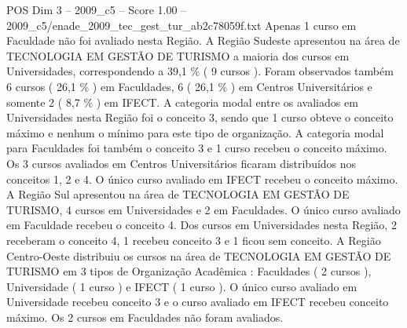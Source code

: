 \begin{textsample}{POS Dim 3 – 2009\_c5 – Score 1.00 – 2009\_c5/enade\_2009\_tec\_gest\_tur\_ab2c78059f.txt}
Apenas 1 curso em Faculdade não foi avaliado nesta Região.
A Região Sudeste apresentou na área de TECNOLOGIA EM GESTÃO DE TURISMO a maioria dos cursos em Universidades, correspondendo a 39,1 \% ( 9 cursos ).
Foram observados também 6 cursos ( 26,1 \% ) em Faculdades, 6 ( 26,1 \% ) em Centros Universitários e somente 2 ( 8,7 \% ) em IFECT.
A categoria modal entre os avaliados em Universidades nesta Região foi o conceito 3, sendo que 1 curso obteve o conceito máximo e nenhum o mínimo para este tipo de organização.
A categoria modal para Faculdades foi também o conceito 3 e 1 curso recebeu o conceito máximo.
Os 3 cursos avaliados em Centros Universitários ficaram distribuídos nos conceitos 1, 2 e 4.
O único curso avaliado em IFECT recebeu o conceito máximo.
A Região Sul apresentou na área de TECNOLOGIA EM GESTÃO DE TURISMO, 4 cursos em Universidades e 2 em Faculdades.
O único curso avaliado em Faculdade recebeu o conceito 4.
Dos cursos em Universidades nesta Região, 2 receberam o conceito 4, 1 recebeu conceito 3 e 1 ficou sem conceito.
A Região Centro-Oeste distribuiu os cursos na área de TECNOLOGIA EM GESTÃO DE TURISMO em 3 tipos de Organização Acadêmica : Faculdades ( 2 cursos ), Universidade ( 1 curso ) e IFECT ( 1 curso ).
O único curso avaliado em Universidade recebeu conceito 3 e o curso avaliado em IFECT recebeu conceito máximo.
Os 2 cursos em Faculdades não foram avaliados.

\end{textsample}
